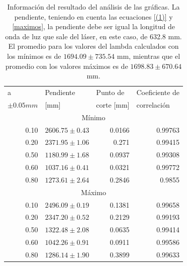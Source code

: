 \documentclass[%
 reprint,
 amsmath,amssymb,
 aps,
]{revtex4-1}
\begin{document}
\begin{table}[H]
  \centering
  \caption{Información del resultado del análisis de las gráficas. La pendiente, teniendo en cuenta las ecuaciones \eqref{(1)} y \eqref{maximos}, la pendiente debe ser igual la longitud de onda de luz que sale del láser, en este caso, de 632.8 mm. El promedio para los valores del lambda calculados con los mínimos es de $1694.09 \pm 735.54$ mm, mientras que el promedio con los valores máximos es de $1698.83 \pm 670.64$ mm.}
    \begin{tabular}{|r|l|r|r|}
    \hline
    \multicolumn{1}{|l|}{a} & Pendiente & \multicolumn{1}{|l|}{Punto de} & \multicolumn{1}{|l|}{Coeficiente de} \\
    \multicolumn{1}{|l|}{$\pm 0.05 mm$} & [mm]  & \multicolumn{1}{|l|}{corte [mm]} & \multicolumn{1}{|l|}{ correlación} \\
    \hline
    \multicolumn{4}{|c|}{Mínimo} \\
    \hline
    0.10  & $2606.75 \pm 0.43$ & 0.0166 & 0.99763 \\
    0.20  & $2371.95 \pm 1.06$ & 0.271 & 0.99415 \\
    0.50  & $1180.99 \pm 1.68$ & 0.0937 & 0.99308 \\
    0.60  & $1037.16 \pm 0.41$ & 0.0321 & 0.99772 \\
    0.80  & $1273.61 \pm 2.64$ & 0.2846 & 0.9855 \\
    \hline
    \multicolumn{4}{|c|}{Máximo} \\
    \hline
    0.10  & $2496.09 \pm 0.19$ & 0.1381 & 0.99658 \\
    0.20  & $2347.20 \pm 0.52$ & 0.2129 & 0.99193 \\
    0.50  & $1322.48 \pm 2.08$ & 0.0635 & 0.99414 \\
    0.60  & $1042.26 \pm 0.91$ & 0.0911 & 0.99586 \\
    0.80  & $1286.14 \pm 1.90$ & 0.3899 & 0.99633 \\
    \hline
    \end{tabular}%
  \label{tab:longitud de onda}%
\end{table}%
\end{document}
